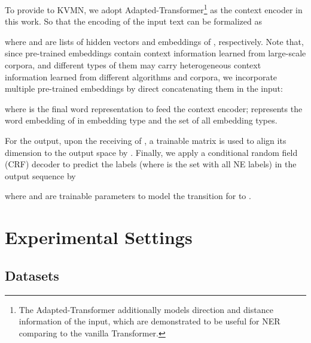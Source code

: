 \documentclass[11pt,a4paper]{article}
\begin{document}
To provide  to KVMN,
we adopt Adapted-Transformer\footnote{The Adapted-Transformer additionally models direction and distance information of the input, which are demonstrated to be useful for NER comparing to the vanilla Transformer.} \cite{DBLP:journals/corr/abs-1911-04474} as the context encoder in this work.
So that the encoding of the input text can be formalized as

where  and  are lists of hidden vectors and embeddings of , respectively.
Note that, since pre-trained embeddings contain context information learned from large-scale corpora, and
different types of them 
may carry heterogeneous context information learned from different algorithms and corpora, 
we incorporate multiple pre-trained embeddings by direct concatenating them in the input:

where  is the final word representation to feed the context encoder; 
 represents the word embedding of  in embedding type  and  the set of all embedding types.


For the output, upon the receiving of ,
a trainable matrix  is used to align its dimension to the output space by .
Finally, we apply a conditional random field (CRF) decoder to predict the labels  (where  is the set with all NE labels) in the output sequence  by

where  and  are trainable parameters to model the transition for  to .




\section{Experimental Settings}
\label{exp}






\subsection{Datasets}
\end{document}
